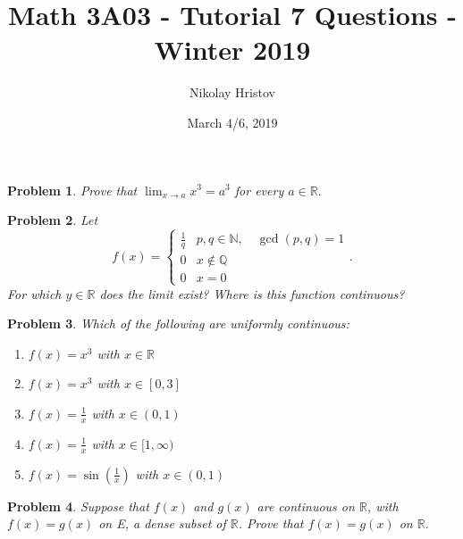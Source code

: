 \documentclass[11pt]{article}
\theoremstyle{plain}
\newtheorem{problem}{Problem}
\theoremstyle{remark}
\newcommand {\mbR} {\mathbb R}
\newcommand {\mbN} {\mathbb N}
\newcommand {\mbQ} {\mathbb Q}
\newcommand {\pwii}[6] {\begin{cases} 
		#1 & #2 \\
		#3 & #4 \\
		#5 & #6
\end{cases}}
\begin{document}
	\title{Math 3A03 - Tutorial 7 Questions - Winter 2019}
	\author{Nikolay Hristov}
	\date{March 4/6, 2019}
	\maketitle
	
	
	\begin{problem}
		Prove that $\displaystyle \lim_{x\rightarrow a} x^3 = a^3$ for every $a\in \mathbb R.$
	\end{problem}
	
	\begin{problem}
		Let \[f(x) = \pwii{\frac 1 q}{p,q\in\mbN, \quad\gcd(p,q)=1}{0}{x\notin \mbQ}{0}{x=0}.\] For which $y\in \mbR$ does the limit exist? Where is this function continuous?
	\end{problem}

	\begin{problem}
		Which of the following are uniformly continuous:
		
		\begin{enumerate}
			\item $f(x)=x^3$ with $x\in\mbR$
			\item $f(x)=x^3$ with $x\in [0,3]$
			\item $f(x)=\frac{1}{x}$ with $x\in(0,1)$
			\item $f(x)=\frac 1 x$ with $x\in [1,\infty)$
			\item $f(x)=\sin\left(\frac 1 x\right)$ with $x\in (0,1)$
		\end{enumerate}
	\end{problem}
	
	\begin{problem}
		Suppose that $f(x)$ and $g(x)$ are continuous on $\mbR$, with $f(x)=g(x)$ on E, a dense subset of $\mbR$. Prove that $f(x)=g(x)$ on $\mbR.$ 
	\end{problem}
	
\end{document}

